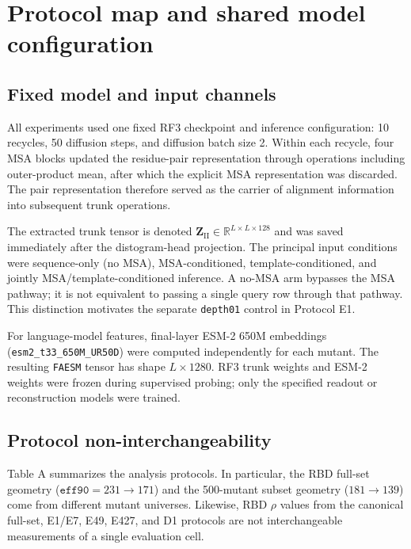 \documentclass[10pt,a4paper]{article}
\newcommand{\FAESM}{\texttt{FAESM}}
\begin{document}
\setcounter{tocdepth}{1}
\setlength{\cftsecnumwidth}{4em}
\tableofcontents

\section{Protocol map and shared model configuration}

\subsection{Fixed model and input channels}

All experiments used one fixed RF3 checkpoint and inference configuration: 10 recycles, 50 diffusion steps, and diffusion batch size 2. Within each recycle, four MSA blocks updated the residue-pair representation through operations including outer-product mean, after which the explicit MSA representation was discarded. The pair representation therefore served as the carrier of alignment information into subsequent trunk operations.

The extracted trunk tensor is denoted $\mathbf{Z}_{\mathrm{II}}\in\mathbb{R}^{L\times L\times128}$ and was saved immediately after the distogram-head projection. The principal input conditions were sequence-only (no MSA), MSA-conditioned, template-conditioned, and jointly MSA/template-conditioned inference. A no-MSA arm bypasses the MSA pathway; it is not equivalent to passing a single query row through that pathway. This distinction motivates the separate \texttt{depth01} control in Protocol E1.

For language-model features, final-layer ESM-2 650M embeddings (\texttt{esm2\_t33\_650M\_UR50D}) were computed independently for each mutant. The resulting \FAESM{} tensor has shape $L\times1280$. RF3 trunk weights and ESM-2 weights were frozen during supervised probing; only the specified readout or reconstruction models were trained.

\subsection{Protocol non-interchangeability}

Table A summarizes the analysis protocols. In particular, the RBD full-set geometry ($\texttt{eff90}=231\rightarrow171$) and the 500-mutant subset geometry ($181\rightarrow139$) come from different mutant universes. Likewise, RBD $\rho$ values from the canonical full-set, E1/E7, E49, E427, and D1 protocols are not interchangeable measurements of a single evaluation cell.
\end{document}
